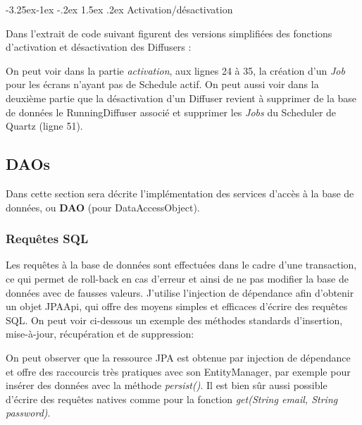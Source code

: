 \documentclass[french]{article}
\makeatletter
\renewcommand\paragraph{\@startsection{paragraph}{4}{\z@}%
                                     {-3.25ex\@plus -1ex \@minus -.2ex}%
                                     {1.5ex \@plus .2ex}%
                                     {\normalfont\normalsize\bfseries}}
\makeatother
\begin{document}
\paragraph{Activation/désactivation}

Dans l'extrait de code suivant figurent des versions simplifiées des fonctions d'activation et désactivation des Diffusers :

\newpage


On peut voir dans la partie \textit{activation}, aux lignes 24 à 35, la création d'un \textit{Job} pour les écrans n'ayant pas de Schedule actif. On peut aussi voir dans la deuxième partie que la désactivation d'un Diffuser revient à supprimer de la base de données le RunningDiffuser associé et supprimer les \textit{Jobs} du Scheduler de Quartz (ligne 51).

\newpage
\subsection{DAOs}

Dans cette section sera décrite l'implémentation des services d'accès à la base de données, ou \textbf{DAO} (pour DataAccessObject). 

\subsubsection{Requêtes SQL}

Les requêtes à la base de données sont effectuées dans le cadre d'une transaction, ce qui permet de roll-back en cas d'erreur et ainsi de ne pas modifier la base de données avec de fausses valeurs. J'utilise l'injection de dépendance afin d'obtenir un objet JPAApi, qui offre des moyens simples et efficaces d'écrire des requêtes SQL. On peut voir ci-dessous un exemple des méthodes standards d'insertion, mise-à-jour, récupération et de suppression:



On peut observer que la ressource JPA est obtenue par injection de dépendance et offre des raccourcis très pratiques avec son EntityManager, par exemple pour insérer des données avec la méthode \textit{persist()}. Il est bien sûr aussi possible d'écrire des requêtes natives comme pour la fonction \textit{get(String email, String password)}.
\end{document}
